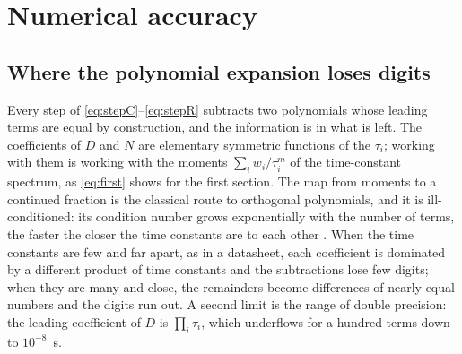 \documentclass[10pt,a4paper]{scrartcl}
\begin{document}
\section{Numerical accuracy}
\label{sec:numerics}

\subsection{Where the polynomial expansion loses digits}
Every step of \eqref{eq:stepC}--\eqref{eq:stepR} subtracts two polynomials whose leading terms are equal by construction, and the information is in what is left. The coefficients of $D$ and $N$ are elementary symmetric functions of the $\tau_i$; working with them is working with the moments $\sum_i w_i/\tau_i^m$ of the time-constant spectrum, as \eqref{eq:first} shows for the first section. The map from moments to a continued fraction is the classical route to orthogonal polynomials, and it is ill-conditioned: its condition number grows exponentially with the number of terms, the faster the closer the time constants are to each other \cite{gautschi2004}. When the time constants are few and far apart, as in a datasheet, each coefficient is dominated by a different product of time constants and the subtractions lose few digits; when they are many and close, the remainders become differences of nearly equal numbers and the digits run out. A second limit is the range of double precision: the leading coefficient of $D$ is $\prod_i\tau_i$, which underflows for a hundred terms down to $10^{-8}$~s.
\end{document}
